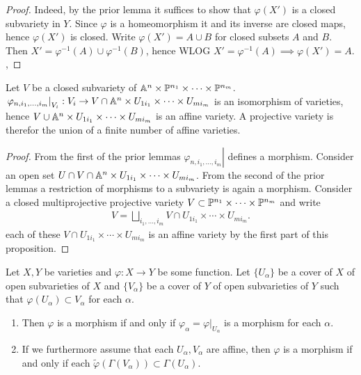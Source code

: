     \begin{proof}
        Indeed, by the prior lemma it suffices to show that $\varphi(X')$ is a closed subvariety in $Y$. Since $\varphi$ is a homeomorphism it and its inverse are closed maps, hence $\varphi(X')$ is closed. Write $\varphi(X')=A\cup B$ for closed subsets $A$ and $B$. Then $X' = \varphi^{-1}(A)\cup\varphi^{-1}(B)$, hence WLOG $X'=\varphi^{-1}(A)\implies \varphi(X')=A.$,  
    \end{proof}
    \begin{proposition}
        Let $V$ be a closed subvariety of $\mathbb{A}^n\times\mathbb{P}^{n_1}\times \cdots \times \mathbb{P}^{n_m}$. $\left.\varphi_{n,i_1,\dots,i_m}\right|_{V_i}:V_i\rightarrow V\cap \mathbb{A}^n\times U_{1i_1}\times \cdots \times U_{mi_m}$ is an isomorphism of varieties, hence $V\cup \mathbb{A}^n\times U_{1i_1}\times \cdots \times U_{mi_m}$ is an affine variety. A projective variety is therefor the union of a finite number of affine varieties. 
    \end{proposition}
    \begin{proof}
        From the first of the prior lemmas $\left.\varphi_{n,i_1,\dots,i_m}\right|$ defines a morphism. Consider an open set $U\cap V\cap\mathbb{A}^n\times U_{1i_1}\times \cdots \times U_{mi_m}$. From the second of the prior lemmas a restriction of morphisms to a subvariety is again a morphism. Consider a closed multiprojective projective variety $V\subset \mathbb{P}^{n_1}\times\cdots\times\mathbb{P}^{n_m}$ and write
        \begin{align*}
            V= \bigsqcup_{i_1,\dots,i_m} V\cap U_{1i_1}\times \cdots \times U_{mi_m}.
        \end{align*}
        each of these $V\cap U_{1i_1}\times \cdots \times U_{mi_m}$ is an affine variety by the first part of this proposition.
    \end{proof}
    \begin{lemma}\label{LocalIsomorphismOnCoveringIsIsomorphism}
        Let $X,Y$ be varieties and $\varphi: X\rightarrow Y$ be some function. Let $\{U_\alpha\}$ be a cover of $X$ of open subvarieties of $X$ and $\{V_\alpha\}$ be a cover of $Y$ of open subvarieties of $Y$ such that $\varphi(U_\alpha)\subset V_\alpha$ for each $\alpha$.
        \begin{enumerate}
            \item Then $\varphi$ is a morphism if and only if $\varphi_\alpha = \left.\varphi\right|_{U_\alpha}$ is a morphism for each $\alpha$.
            \item If we furthermore assume that each $U_\alpha,V_\alpha$ are affine, then $\varphi$ is a morphism if and only if each $\widetilde{\varphi}(\Gamma(V_\alpha))\subset \Gamma(U_\alpha)$.
        \end{enumerate}        
    \end{lemma}
